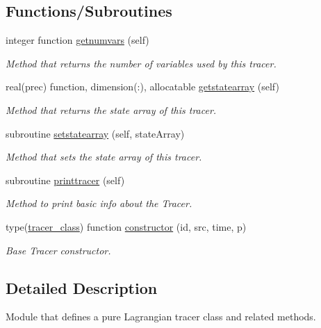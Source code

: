 \subsection*{Functions/\+Subroutines}
\begin{DoxyCompactItemize}
\item 
integer function \mbox{\hyperlink{namespacetracerbase__mod_a0be55b393be0846cbbe6be9feb3bb539}{getnumvars}} (self)
\begin{DoxyCompactList}\small\item\em Method that returns the number of variables used by this tracer. \end{DoxyCompactList}\item 
real(prec) function, dimension(\+:), allocatable \mbox{\hyperlink{namespacetracerbase__mod_adbdd85bd57f1a9debbe7b682099afb1d}{getstatearray}} (self)
\begin{DoxyCompactList}\small\item\em Method that returns the state array of this tracer. \end{DoxyCompactList}\item 
subroutine \mbox{\hyperlink{namespacetracerbase__mod_af85802e927b07e777b94375550246c16}{setstatearray}} (self, state\+Array)
\begin{DoxyCompactList}\small\item\em Method that sets the state array of this tracer. \end{DoxyCompactList}\item 
subroutine \mbox{\hyperlink{namespacetracerbase__mod_ae320123e374df674769dbd48ba5ef46f}{printtracer}} (self)
\begin{DoxyCompactList}\small\item\em Method to print basic info about the Tracer. \end{DoxyCompactList}\item 
type(\mbox{\hyperlink{structtracerbase__mod_1_1tracer__class}{tracer\+\_\+class}}) function \mbox{\hyperlink{namespacetracerbase__mod_aefc12c2007d7598ff9b35733b430a3a2}{constructor}} (id, src, time, p)
\begin{DoxyCompactList}\small\item\em Base Tracer constructor. \end{DoxyCompactList}\end{DoxyCompactItemize}


\subsection{Detailed Description}
Module that defines a pure Lagrangian tracer class and related methods. 


